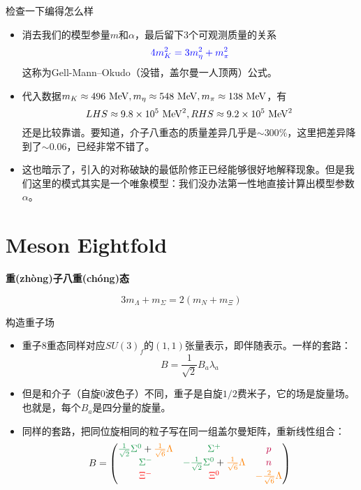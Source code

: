 \documentclass[aspectratio=1610,14pt,mathserif]{beamer}
\newcommand{\bch}{}
\newcommand{\ech}{}
\def\bcenter{\begin{center}}
\def\ecenter{\end{center}}
\def\skipline{{\vskip0.1in}}
\def\tbox#1{\begin{tcolorbox}#1\end{tcolorbox}}
\def\secpage#1#2{\begin{frame}\bch\bcenter{\bf \Huge #1} \skipline \tbox{#2}\ecenter\ech\end{frame}}
\newcommand{\mat}[1]{\begin{pmatrix}#1\end{pmatrix}}
\newcommand{\mev}{\ {\rm MeV}}
\newcommand{\red}[1]{{\color{red} #1}}
\def\green#1{{\color[rgb]{0.1,0.6,0.3}#1}}
\newcommand{\purple}[1]{{\color{purple} #1}}
\newcommand{\orange}[1]{{\color{orange} #1}}
\newcommand{\blue}[1]{{\color{blue} #1}}
\begin{document}
\begin{frame}{检查一下编得怎么样}
\begin{itemize}
\item
消去我们的模型参量$m$和$\alpha$，最后留下3个可观测质量的关系
$$
\blue{4m_K^2 = 3m_\eta^2 + m_\pi^2}
$$
这称为Gell-Mann--Okudo（没错，盖尔曼一人顶两）公式。
\item
代入数据$m_K \approx 496\mev, m_\eta \approx 548\mev, m_\pi \approx 138 \mev$，有
$$
LHS \approx 9.8\times 10^5\mev^2 , RHS \approx 9.2 \times 10^5 \mev^2
$$
还是比较靠谱。要知道，介子八重态的质量差异几乎是$\sim 300\%$，这里把差异降到了$\sim 0.06$，已经非常不错了。
\item
这也暗示了，引入的对称破缺的最低阶修正已经能够很好地解释现象。但是我们这里的模式其实是一个唯象模型：我们没办法第一性地直接计算出模型参数$\alpha$。
\end{itemize}
\end{frame}


\section{Meson Eightfold}
\secpage{重{\small(zh\`ong)}子八重{\small(ch\'ong)}态}{$$3m_\Lambda + m_\Sigma = 2(m_N + m_\Xi)$$}

\begin{frame}{构造重子场}
\begin{itemize}
\item
重子8重态同样对应$SU(3)_f$的$(1,1)$张量表示，即伴随表示。一样的套路：
$$
B = \frac{1}{\sqrt 2} B_a \lambda_a
$$
\item 但是和介子（自旋0波色子）不同，重子是自旋$1/2$费米子，它的场是旋量场。也就是，每个$B_a$是四分量的旋量。
\item 同样的套路，把同位旋相同的粒子写在同一组盖尔曼矩阵，重新线性组合：
$$
B = \mat{\green{\frac{1}{\sqrt 2} \Sigma^0 } + \orange{ \frac{1}{\sqrt 6} \Lambda} & \green{\Sigma^+} & \purple{p} \\
\green{\Sigma^-} & \green{- \frac{1}{\sqrt 2} \Sigma^0} +\orange{ \frac{1}{\sqrt 6} \Lambda} & \purple{n} \\
\red{\Xi^-} & \red{\Xi^0} & \orange{-\frac{2}{\sqrt 6} \Lambda }}
$$
\end{itemize}
\end{frame}
\end{document}
